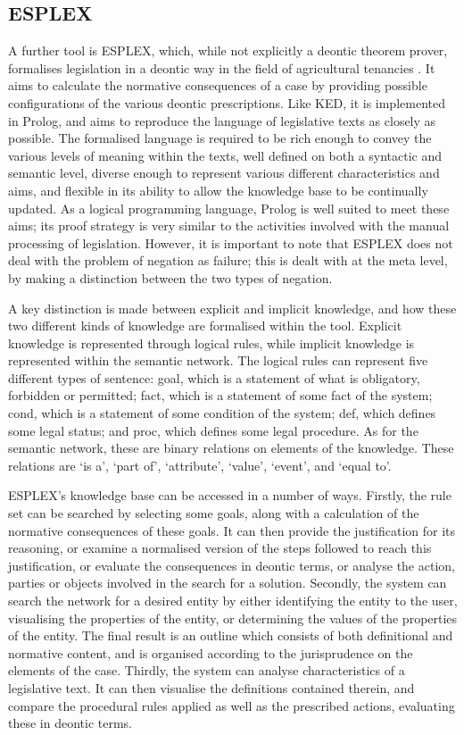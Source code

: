 \documentclass{l4proj}
\begin{document}
\subsection{ESPLEX}
A further tool is ESPLEX, which, while not explicitly a deontic theorem prover, formalises legislation in a deontic way in the field of agricultural tenancies \cite{ESPLEX}. It aims to calculate the normative consequences of a case by providing possible configurations of the various deontic prescriptions. Like KED, it is implemented in Prolog, and aims to reproduce the language of legislative texts as closely as possible. The formalised language is required to be rich enough to convey the various levels of meaning within the texts, well defined on both a syntactic and semantic level, diverse enough to represent various different characteristics and aims, and flexible in its ability to allow the knowledge base to be continually updated. As a logical programming language, Prolog is well suited to meet these aims; its proof strategy is very similar to the activities involved with the manual processing of legislation. However, it is important to note that ESPLEX does not deal with the problem of negation as failure; this is dealt with at the meta level, by making a distinction between the two types of negation. 

A key distinction is made between explicit and implicit knowledge, and how these two different kinds of knowledge are formalised within the tool. Explicit knowledge is represented through logical rules, while implicit knowledge is represented within the semantic network. The logical rules can represent five different types of sentence: goal, which is a statement of what is obligatory, forbidden or permitted; fact, which is a statement of some fact of the system; cond, which is a statement of some condition of the system; def, which defines some legal status; and proc, which defines some legal procedure. As for the semantic network, these are binary relations on elements of the knowledge. These relations are `is a', `part of', `attribute', `value', `event', and `equal to'. 

ESPLEX's knowledge base can be accessed in a number of ways. Firstly, the rule set can be searched by selecting some goals, along with a calculation of the normative consequences of these goals. It can then provide the justification for its reasoning, or examine a normalised version of the steps followed to reach this justification, or evaluate the consequences in deontic terms, or analyse the action, parties or objects involved in the search for a solution. Secondly, the system can search the network for a desired entity by either identifying the entity to the user, visualising the properties of the entity, or determining the values of the properties of the entity. The final result is an outline which consists of both definitional and normative content, and is organised according to the jurisprudence on the elements of the case. Thirdly, the system can analyse characteristics of a legislative text. It can then visualise the definitions contained therein, and compare the procedural rules applied as well as the prescribed actions, evaluating these in deontic terms. 
\end{document}
